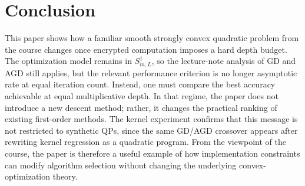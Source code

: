 \documentclass[10pt,english]{article}
\begin{document}
\section{Conclusion}

This paper shows how a familiar smooth strongly convex quadratic problem from the course changes once encrypted computation imposes a hard depth budget. The optimization model remains in $S^1_{m,L}$, so the lecture-note analysis of GD and AGD still applies, but the relevant performance criterion is no longer asymptotic rate at equal iteration count. Instead, one must compare the best accuracy achievable at equal multiplicative depth. In that regime, the paper does not introduce a new descent method; rather, it changes the practical ranking of existing first-order methods. The kernel experiment confirms that this message is not restricted to synthetic QPs, since the same GD/AGD crossover appears after rewriting kernel regression as a quadratic program. From the viewpoint of the course, the paper is therefore a useful example of how implementation constraints can modify algorithm selection without changing the underlying convex-optimization theory.
\end{document}
